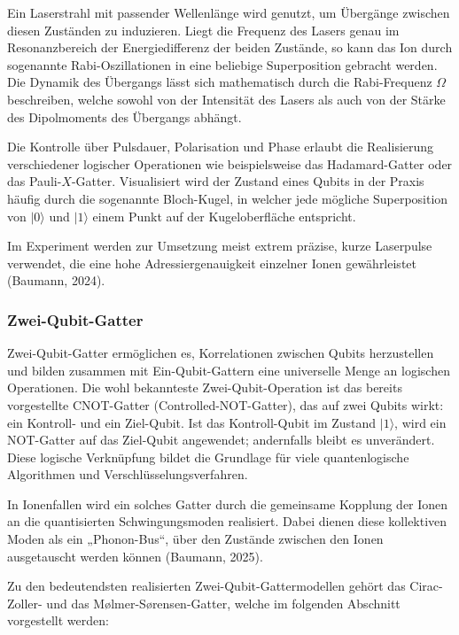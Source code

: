 Ein Laserstrahl mit passender Wellenlänge wird genutzt, um Übergänge zwischen diesen Zuständen zu induzieren. Liegt die Frequenz des Lasers genau im Resonanzbereich der Energiedifferenz der beiden Zustände, so kann das Ion durch sogenannte Rabi-Oszillationen in eine beliebige Superposition gebracht werden. Die Dynamik des Übergangs lässt sich mathematisch durch die Rabi-Frequenz \( \Omega \) beschreiben, welche sowohl von der Intensität des Lasers als auch von der Stärke des Dipolmoments des Übergangs abhängt.

Die Kontrolle über Pulsdauer, Polarisation und Phase erlaubt die Realisierung verschiedener logischer Operationen wie beispielsweise das Hadamard-Gatter oder das Pauli-\( X \)-Gatter. Visualisiert wird der Zustand eines Qubits in der Praxis häufig durch die sogenannte Bloch-Kugel, in welcher jede mögliche Superposition von \( \lvert 0 \rangle \) und \( \lvert 1 \rangle \) einem Punkt auf der Kugeloberfläche entspricht.

Im Experiment werden zur Umsetzung meist extrem präzise, kurze Laserpulse verwendet, die eine hohe Adressiergenauigkeit einzelner Ionen gewährleistet (Baumann, 2024).

\subsubsection{Zwei-Qubit-Gatter}

Zwei-Qubit-Gatter ermöglichen es, Korrelationen zwischen Qubits herzustellen und bilden zusammen mit Ein-Qubit-Gattern eine universelle Menge an logischen Operationen. Die wohl bekannteste Zwei-Qubit-Operation ist das bereits vorgestellte CNOT-Gatter (Controlled-NOT-Gatter), das auf zwei Qubits wirkt: ein Kontroll- und ein Ziel-Qubit. Ist das Kontroll-Qubit im Zustand \( \lvert 1 \rangle \), wird ein NOT-Gatter auf das Ziel-Qubit angewendet; andernfalls bleibt es unverändert. Diese logische Verknüpfung bildet die Grundlage für viele quantenlogische Algorithmen und Verschlüsselungsverfahren.

In Ionenfallen wird ein solches Gatter durch die gemeinsame Kopplung der Ionen an die quantisierten Schwingungsmoden realisiert. Dabei dienen diese kollektiven Moden als ein „Phonon-Bus“, über den Zustände zwischen den Ionen ausgetauscht werden können (Baumann, 2025).

Zu den bedeutendsten realisierten Zwei-Qubit-Gattermodellen gehört das Cirac-Zoller- und das Mølmer-Sørensen-Gatter, welche im folgenden Abschnitt vorgestellt werden:

